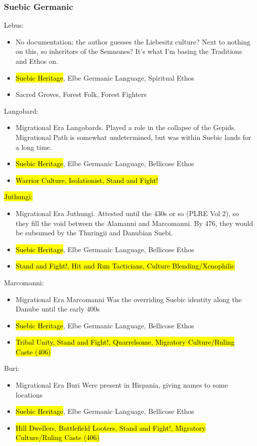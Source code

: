 \documentclass{article}
\begin{document}
	\subsubsection{Suebic Germanic}
	Lebus:
	\begin{itemize}
		\item No documentation; the author guesses the Liebesitz culture?
		Next to nothing on this, so inheritors of the Semnones?
		It’s what I’m basing the Traditions and Ethos on.
		\item \hl{Suebic Heritage}, Elbe Germanic Language, Spiritual Ethos
		\item Sacred Groves, Forest Folk, Forest Fighters
	\end{itemize}
	
	Langobard:
	\begin{itemize}
		\item Migrational Era Langobards.
		Played a role in the collapse of the Gepids.
		Migrational Path is somewhat undetermined, but was within Suebic lands for a long time.
		\item \hl{Suebic Heritage}, Elbe Germanic Language, Bellicose Ethos
		\item \hl{Warrior Culture, Isolationist, Stand and Fight!}
	\end{itemize}
	
	\hl{Juthungi:}
	\begin{itemize}
		\item Migrational Era Juthungi.
		Attested until the 430s or so (PLRE Vol 2), so they fill the void between the Alamanni and Marcomanni.
		By 476, they would be subsumed by the Thuringii and Danubian Suebi.
		\item \hl{Suebic Heritage}, Elbe Germanic Language, Bellicose Ethos
		\item \hl{Stand and Fight!, Hit and Run Tacticians, Culture Blending/Xenophilic}
	\end{itemize}
	
	Marcomanni:
	\begin{itemize}
		\item Migrational Era Marcomanni
		Was the overriding Suebic identity along the Danube until the early 400s
		\item \hl{Suebic Heritage}, Elbe Germanic Language, Bellicose Ethos
		\item \hl{Tribal Unity, Stand and Fight!, Quarrelsome, Migratory Culture/Ruling Caste (406)}
	\end{itemize}
	
	Buri:
	\begin{itemize}
		\item Migrational Era Buri
		Were present in Hispania, giving names to some locations
		\item \hl{Suebic Heritage}, Elbe Germanic Language, Bellicose Ethos
		\item \hl{Hill Dwellers, Battlefield Looters, Stand and Fight!, Migratory Culture/Ruling Caste (406)}
	\end{itemize}
	
\end{document}
